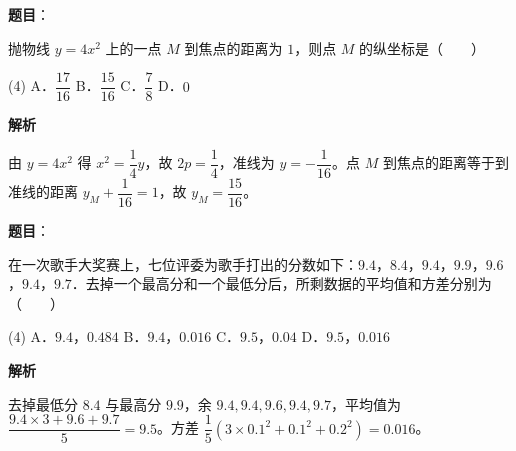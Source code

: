 \begin{answer}

\textbf{题目}：

抛物线 $y = 4x^2$ 上的一点 $M$ 到焦点的距离为 $1$，则点 $M$ 的纵坐标是\mbox{（　　）}

\begin{gkopts}(4)
\task A．$\dfrac{17}{16}$
\task B．$\dfrac{15}{16}$
\task C．$\dfrac{7}{8}$
\task D．$0$
\end{gkopts}

\textbf{解析}

由 $y = 4x^2$ 得 $x^2 = \dfrac{1}{4}y$，故 $2p = \dfrac{1}{4}$，准线为 $y = -\dfrac{1}{16}$。点 $M$ 到焦点的距离等于到准线的距离 $y_M + \dfrac{1}{16} = 1$，故 $y_M = \dfrac{15}{16}$。


\end{answer}
\begin{answer}

\textbf{题目}：

在一次歌手大奖赛上，七位评委为歌手打出的分数如下：$9.4$，$8.4$，$9.4$，$9.9$，$9.6$，$9.4$，$9.7$．去掉一个最高分和一个最低分后，所剩数据的平均值和方差分别为\mbox{（　　）}

\begin{gkopts}(4)
\task A．$9.4$，$0.484$
\task B．$9.4$，$0.016$
\task C．$9.5$，$0.04$
\task D．$9.5$，$0.016$
\end{gkopts}

\textbf{解析}

去掉最低分 $8.4$ 与最高分 $9.9$，余 $9.4, 9.4, 9.6, 9.4, 9.7$，平均值为 $\dfrac{9.4\times 3 + 9.6 + 9.7}{5} = 9.5$。方差 $\dfrac{1}{5}\left(3\times 0.1^2 + 0.1^2 + 0.2^2\right) = 0.016$。


\end{answer}
